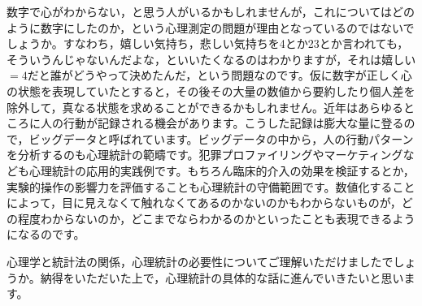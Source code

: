 \documentclass{book}
\begin{document}
数字で心がわからない，と思う人がいるかもしれませんが，これについてはどのように数字にしたのか，という心理測定の問題が理由となっているのではないでしょうか。すなわち，嬉しい気持ち，悲しい気持ちを4とか23とか言われても，そういうんじゃないんだよな，といいたくなるのはわかりますが，それは嬉しい$=4$だと誰がどうやって決めたんだ，という問題なのです。仮に数字が正しく心の状態を表現していたとすると，その後その大量の数値から要約したり個人差を除外して，真なる状態を求めることができるかもしれません。近年はあらゆるところに人の行動が記録される機会があります。こうした記録は膨大な量に登るので，ビッグデータと呼ばれています。ビッグデータの中から，人の行動パターンを分析するのも心理統計の範疇です。犯罪プロファイリングやマーケティングなども心理統計の応用的実践例です。もちろん臨床的介入の効果を検証するとか，実験的操作の影響力を評価することも心理統計の守備範囲です。数値化することによって，目に見えなくて触れなくてあるのかないのかもわからないものが，どの程度わからないのか，どこまでならわかるのかといったことも表現できるようになるのです。

心理学と統計法の関係，心理統計の必要性についてご理解いただけましたでしょうか。納得をいただいた上で，心理統計の具体的な話に進んでいきたいと思います。
% 
% 
% 
% 
% 
% 
% 
% 
% 
% 
% 
% 
% 
% 
% 
% 
% 
% 
% 
% 
% 
% 
% 
% 
% 
% 
% 
% 
% 
{}


\printindex
\end{document}
